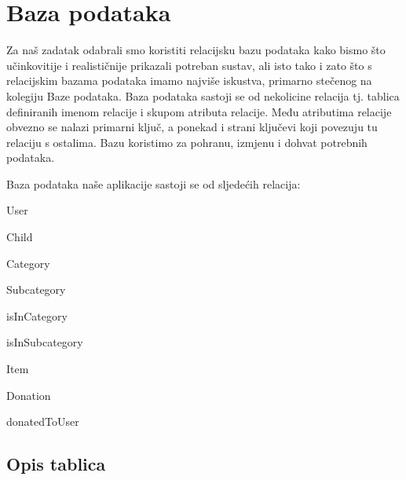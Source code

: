 		\eject
		\section{Baza podataka}
			
		Za naš zadatak odabrali smo koristiti relacijsku bazu podataka kako bismo što učinkovitije i realističnije prikazali potreban sustav, 
		ali isto tako i zato što s relacijskim bazama podataka imamo najviše iskustva, primarno stečenog na kolegiju Baze podataka.
		Baza podataka sastoji se od nekolicine relacija tj. tablica definiranih imenom relacije i skupom atributa relacije.
		Među atributima relacije obvezno se nalazi primarni ključ, a ponekad i strani ključevi koji povezuju tu relaciju s ostalima.
		Bazu koristimo za pohranu, izmjenu i dohvat potrebnih podataka.

		\vspace{15pt}

		Baza podataka naše aplikacije sastoji se od sljedećih relacija:
		\begin{packed_item}
			\item User
			\item Child
			\item Category
			\item Subcategory
			\item isInCategory
			\item isInSubcategory
			\item Item
			\item Donation
			\item donatedToUser
		\end{packed_item}
			
			\eject
			\subsection{Opis tablica}
			
